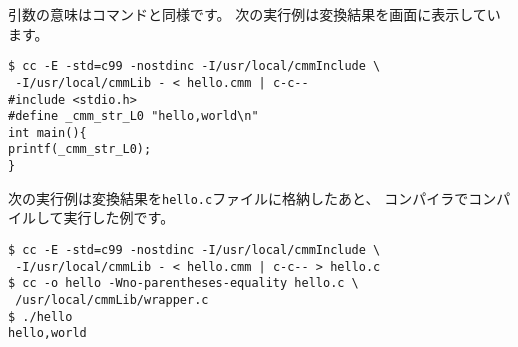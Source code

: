 引数の意味は{\cmmc}コマンドと同様です。
次の実行例は変換結果を画面に表示しています。

\begin{mylist}
\begin{verbatim}
$ cc -E -std=c99 -nostdinc -I/usr/local/cmmInclude \
 -I/usr/local/cmmLib - < hello.cmm | c-c--
#include <stdio.h>
#define _cmm_str_L0 "hello,world\n"
int main(){
printf(_cmm_str_L0);
}
\end{verbatim}
\end{mylist}

次の実行例は変換結果を\verb/hello.c/ファイルに格納したあと、
{\cl}コンパイラでコンパイルして実行した例です。

\begin{mylist}
\begin{verbatim}
$ cc -E -std=c99 -nostdinc -I/usr/local/cmmInclude \
 -I/usr/local/cmmLib - < hello.cmm | c-c-- > hello.c
$ cc -o hello -Wno-parentheses-equality hello.c \
 /usr/local/cmmLib/wrapper.c
$ ./hello
hello,world
\end{verbatim}
\end{mylist}

